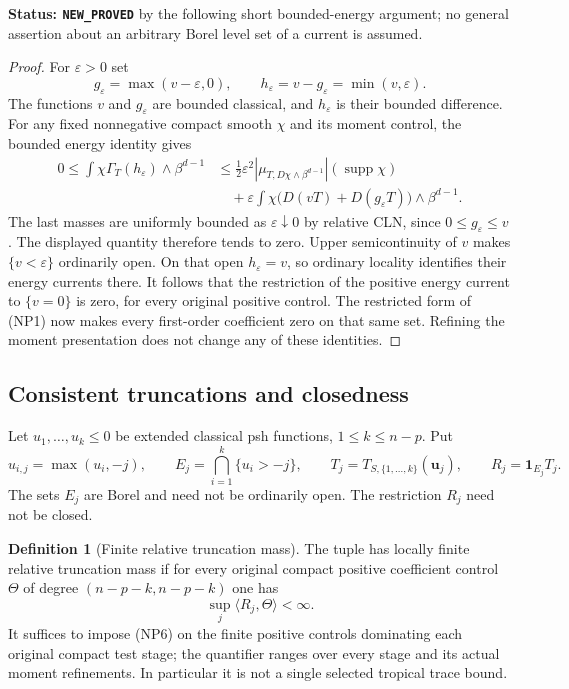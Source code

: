\documentclass[11pt,a4paper]{article}
\numberwithin{equation}{section}
\theoremstyle{definition}
\newtheorem{definition}[theorem]{Definition}
\theoremstyle{remark}
\begin{document}
\noindent\textbf{Status: \texttt{NEW\_PROVED}} by the following
short bounded-energy argument; no general assertion about an arbitrary
Borel level set of a current is assumed.

\begin{proof}
For $\varepsilon>0$ set
\[
 g_\varepsilon=\max(v-\varepsilon,0),\qquad
 h_\varepsilon=v-g_\varepsilon=\min(v,\varepsilon).
\]
The functions $v$ and $g_\varepsilon$ are bounded classical, and $h_\varepsilon$
is their bounded difference.  For any fixed nonnegative compact
smooth $\chi$ and its moment control, the bounded energy identity gives
\begin{align*}
 0\leq\int\chi\Gamma_T(h_\varepsilon)\wedge\beta^{d-1}
 &\leq \tfrac12\varepsilon^2
     |\mu_{T,D\chi\wedge\beta^{d-1}}|(\operatorname{supp}\chi)\\
 &\quad+\varepsilon\int\chi
       \bigl(D(vT)+D(g_\varepsilon T)\bigr)\wedge\beta^{d-1}.
\end{align*}
The last masses are uniformly bounded as $\varepsilon\downarrow0$
by relative CLN, since $0\leq g_\varepsilon\leq v$.  The displayed
quantity therefore tends to zero.  Upper semicontinuity of $v$
makes $\{v<\varepsilon\}$ ordinarily open.  On that open
$h_\varepsilon=v$, so ordinary locality identifies their energy
currents there.  It follows that the restriction of the positive
energy current to $\{v=0\}$ is zero, for every original positive
control.  The restricted form of (NP1) now makes every first-order
coefficient zero on that same set.  Refining the moment presentation
does not change any of these identities.
\end{proof}

\subsection{Consistent truncations and closedness}

Let $u_1,\ldots,u_k\leq0$ be extended classical psh functions,
$1\leq k\leq n-p$.  Put
\[
 u_{i,j}=\max(u_i,-j),\qquad
 E_j=\bigcap_{i=1}^k\{u_i>-j\},\qquad
 T_j=T_{S,\{1,\ldots,k\}}(\mathbf u_j),\qquad
 R_j=\mathbf1_{E_j}T_j.
 \tag{NP5}
\]
The sets $E_j$ are Borel and need not be ordinarily open.  The
restriction $R_j$ need not be closed.

\begin{definition}[Finite relative truncation mass]
\label{def:r11-finite-truncation-mass}
The tuple has locally finite relative truncation mass if for every
original compact positive coefficient control $\Theta$ of degree
$(n-p-k,n-p-k)$ one has
\[
                         \sup_j\langle R_j,\Theta\rangle<\infty.
 \tag{NP6}
\]
It suffices to impose (NP6) on the finite positive controls dominating
each original compact test stage; the quantifier ranges over every
stage and its actual moment refinements.  In particular it is not a
single selected tropical trace bound.
\end{definition}
\end{document}
